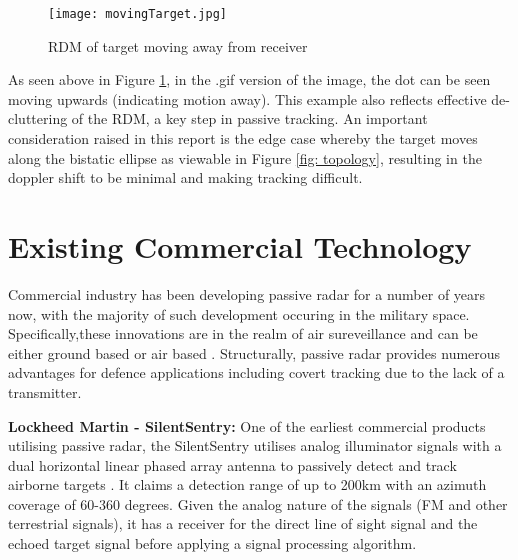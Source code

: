 \begin{figure}[htbp]
    \centering
    \texttt{[image: movingTarget.jpg]}
    \caption{RDM of target moving away from receiver \cite{DTSO2009}}
    \label{fig:rdm}
\end{figure}

\noindent As seen above in Figure \ref{fig:rdm}, in the .gif version of the image, the dot can be seen moving upwards (indicating motion away). This example also reflects effective de-cluttering of the RDM, a key step in passive tracking. An important consideration raised in this report is the edge case whereby the target moves along the bistatic ellipse as viewable in Figure \ref{fig: topology}, resulting in the doppler shift to be minimal and making tracking difficult.



\section{Existing Commercial Technology}
Commercial industry has been developing passive radar for a number of years now, with the majority of such development occuring in the military space. Specifically,these innovations are in the realm of air sureveillance and can be either ground based or air based \cite{FundamentalsPassiveRadar}. Structurally, passive radar provides numerous advantages for defence applications including covert tracking due to the lack of a transmitter.
\par \vspace{0.5cm} 
\noindent \textbf{Lockheed Martin - SilentSentry:} One of the earliest commercial products utilising passive radar, the SilentSentry utilises analog illuminator signals with a dual horizontal linear phased array antenna to passively detect and track airborne targets \cite{DTSO2009}. It claims a detection range of up to 200km with an azimuth coverage of 60-360 degrees. Given the analog nature of the signals (FM and other terrestrial signals), it has a receiver for the direct line of sight signal and the echoed target signal before applying a signal processing algorithm.